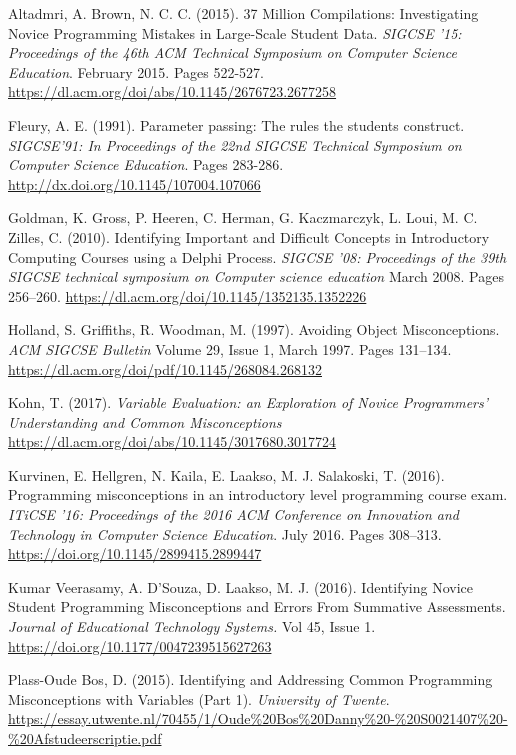 \documentclass[twocolumn]{article}
\begin{document}
\begin{thebibliography}{9}

Altadmri, A. Brown, N. C. C. (2015). 37 Million Compilations: Investigating Novice Programming Mistakes in Large-Scale Student Data. \emph{SIGCSE '15: Proceedings of the 46th ACM Technical Symposium on Computer Science Education}. February 2015. Pages 522-527.
\url{https://dl.acm.org/doi/abs/10.1145/2676723.2677258}

Fleury, A. E. (1991). Parameter passing: The rules the students construct. \emph{SIGCSE’91:  In Proceedings of the 22nd SIGCSE Technical Symposium on Computer Science Education}. Pages 283-286.
\url{http://dx.doi.org/10.1145/107004.107066}

Goldman, K. Gross, P. Heeren, C. Herman, G. Kaczmarczyk, L. Loui, M. C. Zilles, C. (2010). Identifying Important and Difficult Concepts in Introductory Computing Courses using a Delphi Process. \emph{SIGCSE '08: Proceedings of the 39th SIGCSE technical symposium on Computer science education} March 2008. Pages 256–260.
\url{https://dl.acm.org/doi/10.1145/1352135.1352226} 

Holland, S. Griffiths, R. Woodman, M. (1997). Avoiding Object Misconceptions. \emph{ACM SIGCSE Bulletin} Volume 29, Issue 1, March 1997. Pages 131–134.
\url{https://dl.acm.org/doi/pdf/10.1145/268084.268132} 

Kohn, T.  (2017). \emph{Variable Evaluation: an Exploration of Novice Programmers’ Understanding and Common Misconceptions}
\url{https://dl.acm.org/doi/abs/10.1145/3017680.3017724}

Kurvinen, E. Hellgren, N. Kaila, E. Laakso, M. J. Salakoski, T. (2016). Programming misconceptions in an introductory level programming course exam. \emph{ITiCSE '16: Proceedings of the 2016 ACM Conference on Innovation and Technology in Computer Science Education}. July 2016. Pages 308–313. 
\url{https://doi.org/10.1145/2899415.2899447}

Kumar Veerasamy, A. D’Souza, D. Laakso, M. J. (2016). Identifying Novice Student Programming Misconceptions and Errors From Summative Assessments. \emph{Journal of Educational Technology Systems.} Vol 45, Issue 1.  
\url{https://doi.org/10.1177/0047239515627263}

Plass-Oude Bos, D.  (2015). Identifying and Addressing Common Programming Misconceptions with Variables (Part 1). \emph{University of Twente}.
\url{https://essay.utwente.nl/70455/1/Oude\%20Bos\%20Danny\%20-\%20S0021407\%20-\%20Afstudeerscriptie.pdf}


\end{thebibliography}
\end{document}
